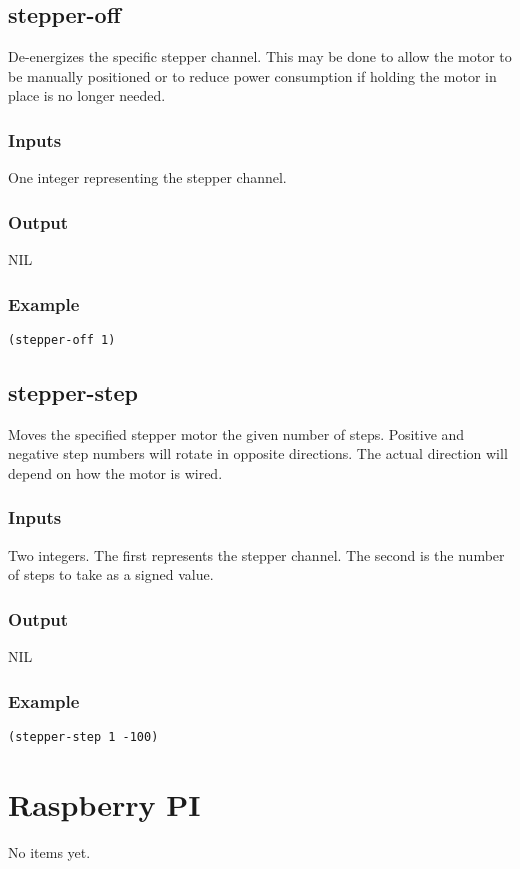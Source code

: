 \documentclass[10pt, openany]{book}
\begin{document}
\section{stepper-off}
De-energizes the specific stepper channel.  This may be done to allow the motor to be manually positioned or to reduce power consumption if holding the motor in place is no longer needed.
\subsection{Inputs}
One integer representing the stepper channel.
\subsection{Output}
NIL
\subsection{Example}
\begin{lstlisting}
(stepper-off 1)
\end{lstlisting}

\section{stepper-step}
Moves the specified stepper motor the given number of steps.  Positive and negative step numbers will rotate in opposite directions.  The actual direction will depend on how the motor is wired.
\subsection{Inputs}
Two integers.  The first represents the stepper channel.  The second is the number of steps to take as a signed value.
\subsection{Output}
NIL
\subsection{Example}
\begin{lstlisting}
(stepper-step 1 -100)
\end{lstlisting}


\chapter{Raspberry PI}
No items yet.
\end{document}
